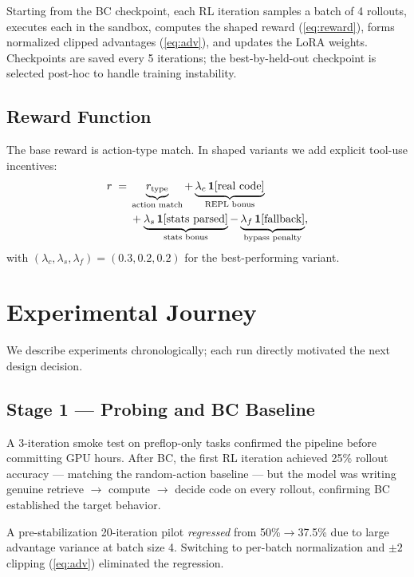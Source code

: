 \documentclass{article}
\begin{document}
Starting from the BC checkpoint, each RL iteration samples a batch of
4 rollouts, executes each in the sandbox, computes the shaped reward
(\cref{eq:reward}), forms normalized clipped advantages (\cref{eq:adv}),
and updates the LoRA weights.
Checkpoints are saved every 5 iterations; the best-by-held-out checkpoint
is selected post-hoc to handle training instability.

\subsection{Reward Function}

The base reward is action-type match.
In shaped variants we add explicit tool-use incentives:
\begin{align}
  r \;=\;
    &\underbrace{r_\text{type}}_{\text{action match}}
    + \underbrace{\lambda_c\,\mathbf{1}[\text{real code}]}_{\text{REPL bonus}} \notag \\
    &+ \underbrace{\lambda_s\,\mathbf{1}[\text{stats parsed}]}_{\text{stats bonus}}
    - \underbrace{\lambda_f\,\mathbf{1}[\text{fallback}]}_{\text{bypass penalty}},
    \label{eq:reward}
\end{align}
with $(\lambda_c,\lambda_s,\lambda_f) = (0.3,0.2,0.2)$ for the
best-performing variant.

\section{Experimental Journey}

We describe experiments chronologically; each run directly motivated
the next design decision.

\subsection{Stage 1 — Probing and BC Baseline}

A 3-iteration smoke test on preflop-only tasks confirmed the pipeline
before committing GPU hours.
After BC, the first RL iteration achieved 25\% rollout accuracy —
matching the random-action baseline — but the model was writing genuine
retrieve $\to$ compute $\to$ decide code on every rollout, confirming
BC established the target behavior.

A pre-stabilization 20-iteration pilot \emph{regressed} from
50\%$\to$37.5\% due to large advantage variance at batch size 4.
Switching to per-batch normalization and $\pm2$ clipping
(\cref{eq:adv}) eliminated the regression.
\end{document}
